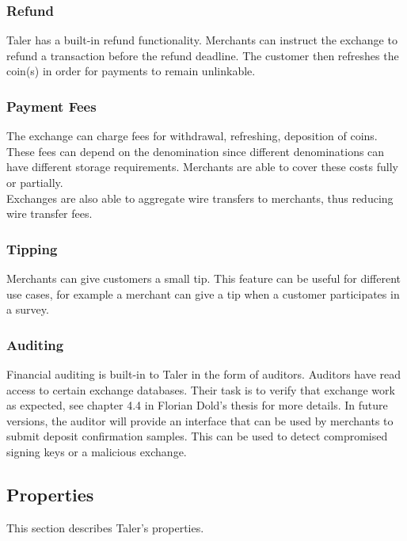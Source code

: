 \subsubsection{Refund}
Taler has a built-in refund functionality.
Merchants can instruct the exchange to refund a transaction before the refund deadline.
The customer then refreshes the coin(s) in order for payments to remain unlinkable.

\subsubsection{Payment Fees}
The exchange can charge fees for withdrawal, refreshing, deposition of coins.
These fees can depend on the denomination since different denominations can have different storage requirements.
Merchants are able to cover these costs fully or partially.
\\Exchanges are also able to aggregate wire transfers to merchants, thus reducing wire transfer fees.

\subsubsection{Tipping}
Merchants can give customers a small tip.
This feature can be useful for different use cases, for example a merchant can give a tip when a customer participates in a survey.

\subsubsection{Auditing}
Financial auditing is built-in to Taler in the form of auditors.
Auditors have read access to certain exchange databases.
Their task is to verify that exchange work as expected, see chapter 4.4 in Florian Dold's thesis \cite{dold:the-gnu-taler-system} for more details.
In future versions, the auditor will provide an interface that can be used by merchants to submit deposit confirmation samples.
This can be used to detect compromised signing keys or a malicious exchange.

\subsection{Properties}
\label{sec:taler-properties}
This section describes Taler's properties.

